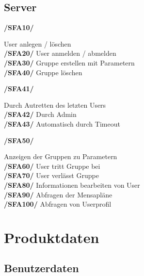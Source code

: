 \documentclass[a4paper]{scrreprt}
\begin{document}
\section{Server}

\begin{addmargin}[25pt]{0pt} 
\hypertarget{sfa10}{\textbf{/SFA10/}} User anlegen / löschen\\
\hypertarget{sfa20}{\textbf{/SFA20/}} User anmelden / abmelden\\
\hypertarget{sfa30}{\textbf{/SFA30/}} Gruppe erstellen mit Parametern\\
\hypertarget{sfa40}{\textbf{/SFA40/}} Gruppe löschen\\
	\begin{addmargin}[25pt]{0pt} 
	\hypertarget{sfa41}{\textbf{/SFA41/}} Durch Autretten des letzten Users\\
	\hypertarget{sfa42}{\textbf{/SFA42/}} Durch Admin\\
	\hypertarget{sfa43}{\textbf{/SFA43/}} Automatisch durch Timeout\\
	\end{addmargin}
\hypertarget{sfa50}{\textbf{/SFA50/}} Anzeigen der Gruppen zu Parametern\\
\hypertarget{sfa60}{\textbf{/SFA60/}} User tritt Gruppe bei\\
\hypertarget{sfa70}{\textbf{/SFA70/}} User verlässt Gruppe\\
\hypertarget{sfa80}{\textbf{/SFA80/}} Informationen bearbeiten von User\\
\hypertarget{sfa90}{\textbf{/SFA90/}} Abfragen der Mensapläne\\
\hypertarget{sfa100}{\textbf{/SFA100/}} Abfragen von Userprofil\\
\end{addmargin}

\chapter{Produktdaten}

\section{Benutzerdaten}
\end{document}
